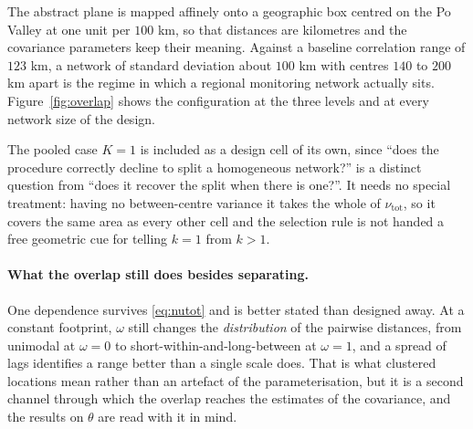 \begin{table}[t]
\centering
\caption{The three levels of the overlap, at $K=3$. The dispersion within a regime is what the centres leave over from the fixed total $\nu_{\mathrm{tot}}$, so the footprint of the network is the same in all three. The Bayes error and the attainable index are those of the optimal rule that assigns a location to the nearest centre, estimated from $200{,}000$ draws: they are what \emph{any} purely spatial procedure could achieve, and the penalty of Section~\ref{sec2:scstem} is the device that lets the model approach them.}
\label{tab:overlap}

\end{table}

The abstract plane is mapped affinely onto a geographic box centred on the Po Valley at one unit per $100$ km, so that distances are kilometres and the covariance parameters keep their meaning. Against a baseline correlation range of $123$ km, a network of standard deviation about $100$ km with centres $140$ to $200$ km apart is the regime in which a regional monitoring network actually sits. Figure~\ref{fig:overlap} shows the configuration at the three levels and at every network size of the design.

The pooled case $K=1$ is included as a design cell of its own, since ``does the procedure correctly decline to split a homogeneous network?'' is a distinct question from ``does it recover the split when there is one?''. It needs no special treatment: having no between-centre variance it takes the whole of $\nu_{\mathrm{tot}}$, so it covers the same area as every other cell and the selection rule is not handed a free geometric cue for telling $k=1$ from $k>1$.

\paragraph{What the overlap still does besides separating.} One dependence survives \eqref{eq:nutot} and is better stated than designed away. At a constant footprint, $\omega$ still changes the \emph{distribution} of the pairwise distances, from unimodal at $\omega=0$ to short-within-and-long-between at $\omega=1$, and a spread of lags identifies a range better than a single scale does. That is what clustered locations mean rather than an artefact of the parameterisation, but it is a second channel through which the overlap reaches the estimates of the covariance, and the results on $\theta$ are read with it in mind.

